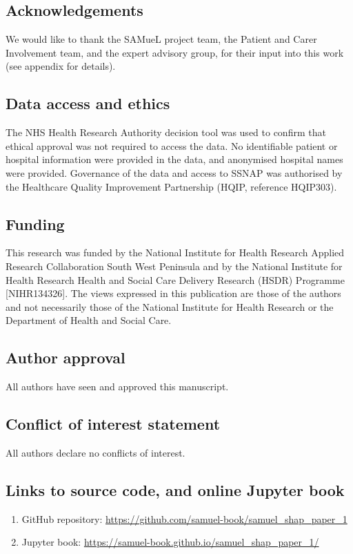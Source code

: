 \clearpage
\newpage

\subsection*{Acknowledgements}

We would like to thank the SAMueL project team, the Patient and Carer Involvement team, and the expert advisory group, for their input into this work (see appendix for details).

\subsection*{Data access and ethics}

The NHS Health Research Authority decision tool was used to confirm that ethical approval was not required to access the data. No identifiable patient or hospital information were provided in the data, and anonymised hospital names were provided. Governance of the data and access to SSNAP was authorised by the Healthcare Quality Improvement Partnership (HQIP, reference HQIP303). 

\subsection*{Funding}

This research was funded by the National Institute for Health Research Applied Research Collaboration South West Peninsula and by the National Institute for Health Research Health and Social Care Delivery Research (HSDR) Programme [NIHR134326]. The views expressed in this publication are those of the authors and not necessarily those of the National Institute for Health Research or the Department of Health and Social Care.

\subsection*{Author approval}

All authors have seen and approved this manuscript.

\subsection*{Conflict of interest statement}

All authors declare no conflicts of interest.

\subsection*{Links to source code, and online Jupyter book}
\begin{enumerate}
    \item GitHub repository: \url{https://github.com/samuel-book/samuel_shap_paper_1} 
    \item Jupyter book: \url{https://samuel-book.github.io/samuel_shap_paper_1/}
\end{enumerate}
